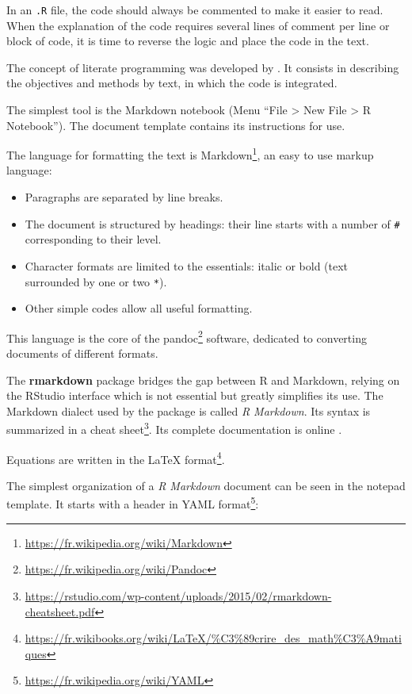 \documentclass[
  12pt,
  american,
  a4paper,
  extrafontsizes,onecolumn,openright
  ]{memoir}
\providecommand{\tightlist}{%
  \setlength{\itemsep}{0pt}\setlength{\parskip}{0pt}}
\newlength{\rf}
\begin{document}
In an \texttt{.R} file, the code should always be commented to make it easier to read.
When the explanation of the code requires several lines of comment per line or block of code, it is time to reverse the logic and place the code in the text.

The concept of literate programming was developed by \textcite{Knuth1984}.
It consists in describing the objectives and methods by text, in which the code is integrated.

The simplest tool is the Markdown notebook (Menu \enquote{File \textgreater{} New File \textgreater{} R Notebook}).
The document template contains its instructions for use.

The language for formatting the text is Markdown\footnote{\url{https://fr.wikipedia.org/wiki/Markdown}}, an easy to use markup language:

\begin{itemize}
\tightlist
\item
  Paragraphs are separated by line breaks.
\item
  The document is structured by headings: their line starts with a number of \texttt{\#} corresponding to their level.
\item
  Character formats are limited to the essentials: italic or bold (text surrounded by one or two \texttt{*}).
\item
  Other simple codes allow all useful formatting.
\end{itemize}

This language is the core of the pandoc\footnote{\url{https://fr.wikipedia.org/wiki/Pandoc}} software, dedicated to converting documents of different formats.

The \textbf{rmarkdown} package \autocite{Xie2015} bridges the gap between R and Markdown, relying on the RStudio interface which is not essential but greatly simplifies its use.
The Markdown dialect used by the package is called \emph{R Markdown}.
Its syntax is summarized in a cheat sheet\footnote{\url{https://rstudio.com/wp-content/uploads/2015/02/rmarkdown-cheatsheet.pdf}}.
Its complete documentation is online \autocite{Xie2018}.

Equations are written in the LaTeX format\footnote{\url{https://fr.wikibooks.org/wiki/LaTeX/\%C3\%89crire_des_math\%C3\%A9matiques}}.

The simplest organization of a \emph{R Markdown} document can be seen in the notepad template.
It starts with a header in YAML format\footnote{\url{https://fr.wikipedia.org/wiki/YAML}}:
\end{document}

